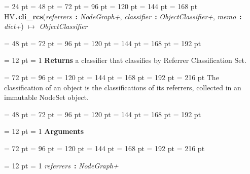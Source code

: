 {{{{{{\par}
\par}
\par}
\par}
\par}
{\par \noindent  \leftskip = 24 pt  \leftmargini = 48 pt  \leftmarginii = 72 pt  \leftmarginiii = 96 pt  \leftmarginiv = 120 pt  \leftmarginv = 144 pt  \leftmarginvi = 168 pt HV{\tt .\/}{\bf {\large {\bf cli{\_}rcs\/}}\/}({\em referrers\/}~{\bf :}  {\em NodeGraph+\/}, {\em classifier\/}~{\bf :}  {\em ObjectClassifier+\/}, {\em memo\/}~{\bf :}  {\em dict+\/}) \(\mapsto \)  {\em ObjectClassifier\/}{\par \noindent
{\par \noindent  \leftskip = 48 pt  \leftmargini = 72 pt  \leftmarginii = 96 pt  \leftmarginiii = 120 pt  \leftmarginiv = 144 pt  \leftmarginv = 168 pt  \leftmarginvi = 192 pt {\par \noindent
{\par \pagebreak[3.100000] \noindent \hangindent = 12 pt \hangafter = 1 
{\bf Returns \/} a classifier that classifies by Referrer Classification Set.\par}
{\par \noindent  \leftskip = 72 pt  \leftmargini = 96 pt  \leftmarginii = 120 pt  \leftmarginiii = 144 pt  \leftmarginiv = 168 pt  \leftmarginv = 192 pt  \leftmarginvi = 216 pt  The classification of an object is the classifications of its
referrers, collected in an immutable NodeSet object.
\par}
\par}
\par}
{\par \noindent  \leftskip = 48 pt  \leftmargini = 72 pt  \leftmarginii = 96 pt  \leftmarginiii = 120 pt  \leftmarginiv = 144 pt  \leftmarginv = 168 pt  \leftmarginvi = 192 pt {\par \noindent
{\par \pagebreak[3.100000] \noindent \hangindent = 12 pt \hangafter = 1 
{\bf Arguments\/}\par}
{\par \noindent  \leftskip = 72 pt  \leftmargini = 96 pt  \leftmarginii = 120 pt  \leftmarginiii = 144 pt  \leftmarginiv = 168 pt  \leftmarginv = 192 pt  \leftmarginvi = 216 pt {\par \noindent
{\par \pagebreak[3.000000] \noindent \hangindent = 12 pt \hangafter = 1 
{\em referrers\/}~{\bf :}  {\em NodeGraph+\/}\par}
}}}}}}}
